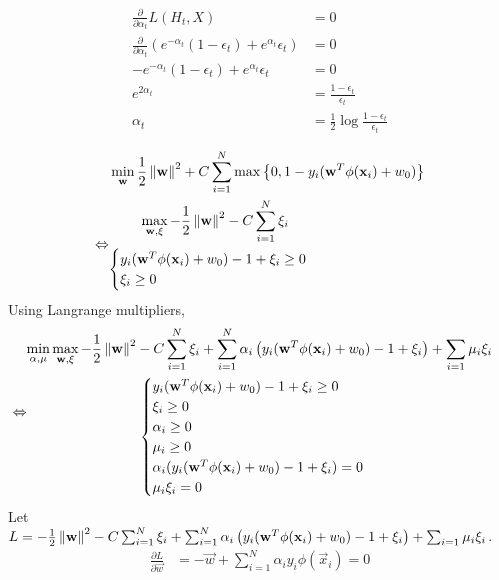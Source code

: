 \documentclass{introtosml}
\newcommand{\x}{\vec{x}}
\newcommand{\w}{\vec{w}}
\newcommand{\e}[1]{\epsilon_{#1}}
\newcommand\ywxxi{y_i (\w^T \phi(\x_i) + w_0) - 1 + \xi_i}
\newcommand\loss{
  - \frac{1}{2} \norm{\w}^2 - C \sum_{i=1}^N \xi_i
  + \sum_{i=1}^N \alpha_i \left( y_i (\w^T \phi(\x_i) + w_0) - 1 + \xi_i \right)
  + \sum_{i=1} \mu_i \xi_i}
\begin{document}
\begin{p}
  \item
    \begin{align*}
      \frac{\partial}{\partial \alpha_t} L(H_t, X) & = 0 \\
      \frac{\partial}{\partial \alpha_t} \left(
        e^{-\alpha_t} (1 - \e{t}) + e^{\alpha_t} \e{t}
      \right) & = 0 \\
      - e^{-\alpha_t} (1 - \e{t}) + e^{\alpha_t} \e{t} & = 0 \\
      e^{2 \alpha_t} & = \frac{1 - \e{t}}{\e{t}} \\
      \alpha_t & = \frac{1}{2} \log \frac{1 - \e{t}}{\e{t}}
    \end{align*}

  \item
    \begin{align*}
      & \min_\w \frac{1}{2} \norm{\w}^2
      + C \sum_{i=1}^N \max \left\{ 0, 1 - y_i (\w^T \phi(\x_i) + w_0) \right\} \\
      \Leftrightarrow & \begin{gathered}
        \max_{\w, \xi} - \frac{1}{2} \norm{\w}^2 - C \sum_{i=1}^N \xi_i \\
        \begin{cases}
          y_i (\w^T \phi(\x_i) + w_0) - 1 + \xi_i \ge 0 \\
          \xi_i \ge 0
        \end{cases}
      \end{gathered}
    \end{align*}
    Using Langrange multipliers,
    \begin{align*}
      \Leftrightarrow & \begin{gathered}
        \min_{\alpha, \mu} \max_{\w, \xi} \loss \\
        \begin{cases}
          \ywxxi \ge 0 \\
          \xi_i \ge 0 \\
          \alpha_i \ge 0 \\
          \mu_i \ge 0 \\
          \alpha_i (\ywxxi) = 0 \\
          \mu_i \xi_i = 0
        \end{cases}
      \end{gathered}
    \end{align*}
    Let $L = \loss$.
    \begin{align*}
      \frac{\partial L}{\partial \w} & = - \w + \sum_{i=1}^N \alpha_i y_i \phi(\x_i) = 0 \\

\end{align*}
\end{p}
\end{document}
